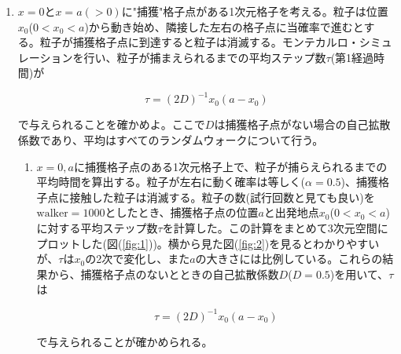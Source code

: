 \documentclass{jsarticle}
\begin{document}
        \begin{enumerate}
            \renewcommand{\labelenumi}{\alph{enumi}.}
            \renewcommand{\labelenumii}{}

            \item  $x=0$と$x=a(>0)$に"捕獲"格子点がある1次元格子を考える。粒子は位置$x_{0}$($0<x_{0}<a$)から動き始め、隣接した左右の格子点に当確率で進むとする。粒子が捕獲格子点に到達すると粒子は消滅する。モンテカルロ・シミュレーションを行い、粒子が捕まえられるまでの平均ステップ数$\tau$(第1経過時間)が

            \begin{equation}
                \tau = (2D)^{-1}x_{0}(a-x_{0})
            \end{equation}

            で与えられることを確かめよ。ここで$D$は捕獲格子点がない場合の自己拡散係数であり、平均はすべてのランダムウォークについて行う。

                \begin{enumerate}
                    \item $x=0,a$に捕獲格子点のある1次元格子上で、粒子が捕らえられるまでの平均時間を算出する。粒子が左右に動く確率は等しく($\alpha=0.5$)、捕獲格子点に接触した粒子は消滅する。粒子の数(試行回数と見ても良い)を$\mathrm{walker}=1000$としたとき、捕獲格子点の位置$a$と出発地点$x_{0}$($0<x_{0}<a$)に対する平均ステップ数$\tau$を計算した。この計算をまとめて3次元空間にプロットした(図(\ref{fig:1}))。横から見た図(\ref{fig:2})を見るとわかりやすいが、$\tau$は$x_{0}$の2次で変化し、また$a$の大きさには比例している。これらの結果から、捕獲格子点のないとときの自己拡散係数$D$($D=0.5$)を用いて、$\tau$は

                    \begin{equation}
                        \tau = (2D)^{-1}x_{0}(a-x_{0})
                    \end{equation}

                    で与えられることが確かめられる。


\end{enumerate}
\end{enumerate}
\end{document}
